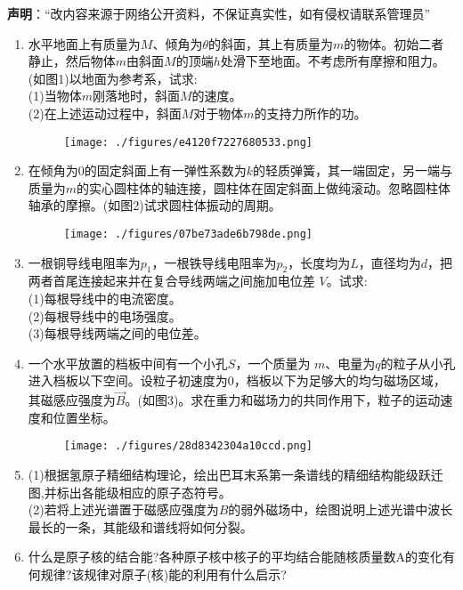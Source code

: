 
\textbf{声明}：“改内容来源于网络公开资料，不保证真实性，如有侵权请联系管理员”
\begin{enumerate}
\item 水平地面上有质量为$M$、倾角为$\theta$的斜面，其上有质量为$m$的物体。初始二者静止，然后物体$m$由斜面$M$的顶端$h$处滑下至地面。不考虑所有摩擦和阻力。(如图1)以地面为参考系，试求:\\
(1)当物体$m$刚落地时，斜面$M$的速度。\\
(2)在上述运动过程中，斜面$M$对于物体$m$的支持力所作的功。
\begin{figure}[ht]
\centering
\texttt{[image: ./figures/e4120f7227680533.png]}
\caption{} \label{fig_SSDPEE_1}
\end{figure}
\item 在倾角为0的固定斜面上有一弹性系数为$k$的轻质弹簧，其一端固定，另一端与质量为$m$的实心圆柱体的轴连接，圆柱体在固定斜面上做纯滚动。忽略圆柱体轴承的摩擦。(如图2)试求圆柱体振动的周期。
\begin{figure}[ht]
\centering
\texttt{[image: ./figures/07be73ade6b798de.png]}
\caption{} \label{fig_SSDPEE_2}
\end{figure}
\item 一根铜导线电阻率为$p_1$，一根铁导线电阻率为$p_2$，长度均为$L$，直径均为$d$，把两者首尾连接起来并在复合导线两端之间施加电位差 $V$。试求:\\
(1)每根导线中的电流密度。\\
(2)每根导线中的电场强度。\\
(3)每根导线两端之间的电位差。
\item 一个水平放置的档板中间有一个小孔$S$，一个质量为 $m$、电量为$q$的粒子从小孔进入档板以下空间。设粒子初速度为0，档板以下为足够大的均匀磁场区域，其磁感应强度为$\vec{B}$。(如图3)。求在重力和磁场力的共同作用下，粒子的运动速度和位置坐标。
\begin{figure}[ht]
\centering
\texttt{[image: ./figures/28d8342304a10ccd.png]}
\caption{} \label{fig_SSDPEE_3}
\end{figure}
\item (1)根据氢原子精细结构理论，绘出巴耳末系第一条谱线的精细结构能级跃迁图,并标出各能级相应的原子态符号。\\
(2)若将上述光谱置于磁感应强度为$B$的弱外磁场中，绘图说明上述光谱中波长最长的一条，其能级和谱线将如何分裂。
\item 什么是原子核的结合能?各种原子核中核子的平均结合能随核质量数A的变化有何规律?该规律对原子(核)能的利用有什么启示?
\end{enumerate}